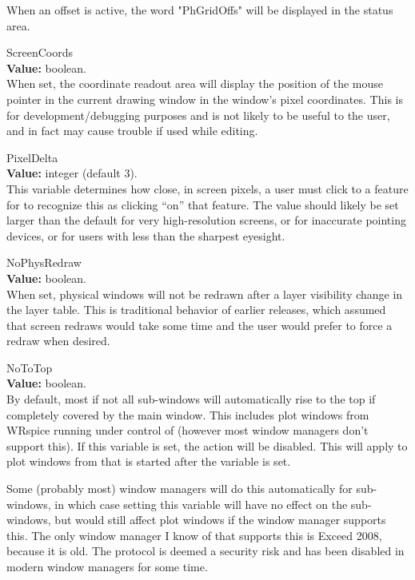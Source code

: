 \begin{description}
When an offset is active, the word {\vt "PhGridOffs"} will be 
displayed in the status area.

\item{\et ScreenCoords}\\
{\bf Value:} boolean.\\
When set, the coordinate readout area will display the position of the
mouse pointer in the current drawing window in the window's pixel
coordinates.  This is for development/debugging purposes and is not
likely to be useful to the user, and in fact may cause trouble if used
while editing.

\item{\et PixelDelta}\\
{\bf Value:} integer (default 3).\\
This variable determines how close, in screen pixels, a user must
click to a feature for {\Xic} to recognize this as clicking ``on''
that feature.  The value should likely be set larger than the default
for very high-resolution screens, or for inaccurate pointing devices,
or for users with less than the sharpest eyesight. 

\item{\et NoPhysRedraw}\\
{\bf Value:} boolean.\\
When set, physical windows will not be redrawn after a layer
visibility change in the layer table.  This is traditional behavior of
earlier {\Xic} releases, which assumed that screen redraws would take
some time and the user would prefer to force a redraw when desired.

\item{\et NoToTop}\\
{\bf Value:} boolean.\\
By default, most if not all {\Xic} sub-windows will automatically rise
to the top if completely covered by the {\Xic} main window.  This
includes plot windows from {WRspice} running under control of {\Xic}
(however most window managers don't support this).  If this variable
is set, the action will be disabled.  This will apply to plot windows
from {\WRspice} that is started after the variable is set. 

Some (probably most) window managers will do this automatically for
sub-windows, in which case setting this variable will have no effect
on the {\Xic} sub-windows, but would still affect {\WRspice} plot
windows if the window manager supports this.  The only window manager
I know of that supports this is Exceed 2008, because it is old.  The
protocol is deemed a security risk and has been disabled in modern
window managers for some time.

\end{description}


